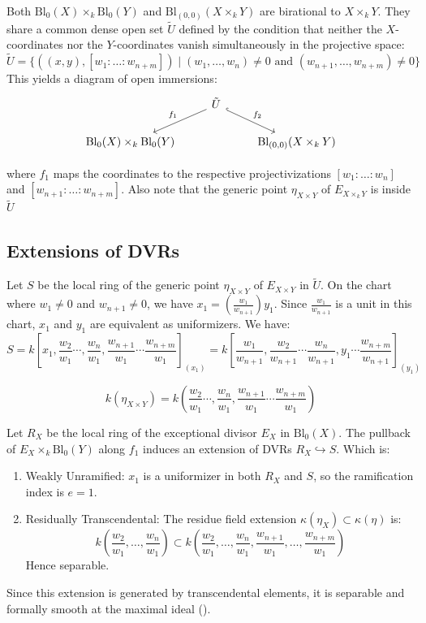 Both $\text{Bl}_0(X) \times_k \text{Bl}_0(Y)$ and $\text{Bl}_{(0,0)}(X \times_k Y)$ are birational to $X \times_k Y$. 
They share a common dense open set $\tilde{U}$ defined by the condition that neither the $X$-coordinates nor the $Y$-coordinates vanish simultaneously in the projective space:
$$\tilde{U} = \{ ((x,y), [w_1: \dots : w_{n+m}]) \mid (w_1, \dots, w_n) \neq 0 \text{ and } (w_{n+1}, \dots, w_{n+m}) \neq 0 \}$$This yields a diagram of open immersions:
$$ 
   \begin{tikzcd}
        & \tilde{U} \arrow[dl, "f_1"'] \arrow[dr, "f_2", hook] & \\
        \text{Bl}_0(X) \times_k \text{Bl}_0(Y) & & \text{Bl}_{(0,0)}(X \times_k Y)
    \end{tikzcd}
$$
    
    where $f_1$ maps the coordinates to the respective projectivizations $[w_1: \dots : w_n]$ and $[w_{n+1}: \dots : w_{n+m}]$.
    Also note that the generic point $\eta_{X \times Y}$  of $E_{X \times_k Y}$ is inside $\tilde{U}$

\subsection*{Extensions of DVRs}
Let $S$ be the local ring of the generic point $\eta_{X\times Y}$ of $E_{X \times Y}$ in $\tilde{U}$. 
On the chart where $w_1 \neq 0$ and $w_{n+1} \neq 0$, we have 
$x_1 = (\frac{w_1}{w_{n+1}}) y_1$. 
Since $\frac{w_1}{w_{n+1}}$ is a unit in this chart, $x_1$ and $y_1$ are equivalent as uniformizers.
We have:
$$
S=k\left[x_1, \frac{w_2}{w_1} \cdots, \frac{w_n}{w_1}, \frac{w_{n+1}}{w_1} \cdots \frac{w_{n+m}}{w_1}\right]_{(x_1)} = 
k\left[\frac{w_1}{w_{n+1}}, \frac{w_2}{w_{n+1}} \cdots \frac{w_n}{w_{n+1}}, y_1 \cdots \frac{w_{n+m}}{w_{n+1}}\right]_{(y_1)}
$$

$$k(\eta_{X \times Y}) = k\left(\frac{w_2}{w_1} \cdots, \frac{w_n}{w_1}, \frac{w_{n+1}}{w_1} \cdots \frac{w_{n+m}}{w_1}\right)$$

Let $R_X$ be the local ring of the exceptional divisor $E_X$ in $\text{Bl}_0(X)$. 
The pullback of $E_X \times_k \text{Bl}_0(Y)$ along $f_1$ induces an extension of DVRs $R_X \hookrightarrow S$. Which is:
\begin{enumerate}
    \item Weakly Unramified: $x_1$ is a uniformizer in both $R_X$ and $S$, so the ramification index is $e=1$.
    \item Residually Transcendental: The residue field extension $\kappa(\eta_X) \subset \kappa(\eta)$ is:
    $$k\left(\frac{w_2}{w_1}, \dots, \frac{w_n}{w_1}\right) \subset k\left(\frac{w_2}{w_1}, \dots, \frac{w_n}{w_1}, \frac{w_{n+1}}{w_1}, \dots, \frac{w_{n+m}}{w_1}\right)$$
    Hence separable.
\end{enumerate}
Since this extension is generated by transcendental elements, it is separable and formally smooth at the maximal ideal ().

